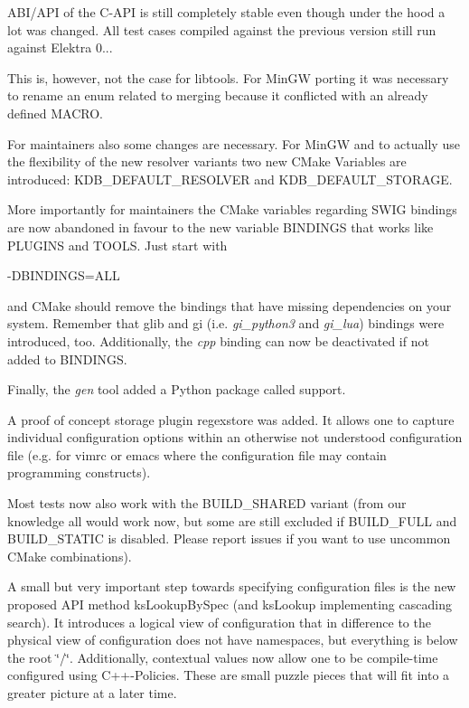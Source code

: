 A\+B\+I/\+A\+PI of the C-\/\+A\+PI is still completely stable even though under the hood a lot was changed. All test cases compiled against the previous version still run against Elektra 0...

This is, however, not the case for libtools. For Min\+GW porting it was necessary to rename an enum related to merging because it conflicted with an already defined M\+A\+C\+RO.

For maintainers also some changes are necessary. For Min\+GW and to actually use the flexibility of the new resolver variants two new C\+Make Variables are introduced\+: K\+D\+B\+\_\+\+D\+E\+F\+A\+U\+L\+T\+\_\+\+R\+E\+S\+O\+L\+V\+ER and K\+D\+B\+\_\+\+D\+E\+F\+A\+U\+L\+T\+\_\+\+S\+T\+O\+R\+A\+GE.

More importantly for maintainers the C\+Make variables regarding S\+W\+IG bindings are now abandoned in favour to the new variable B\+I\+N\+D\+I\+N\+GS that works like P\+L\+U\+G\+I\+NS and T\+O\+O\+LS. Just start with


\begin{DoxyCode}
-DBINDINGS=ALL
\end{DoxyCode}


and C\+Make should remove the bindings that have missing dependencies on your system. Remember that glib and gi (i.\+e. {\itshape gi\+\_\+python3} and {\itshape gi\+\_\+lua}) bindings were introduced, too. Additionally, the {\itshape cpp} binding can now be deactivated if not added to B\+I\+N\+D\+I\+N\+GS.

Finally, the {\itshape gen} tool added a Python package called {\ttfamily support}.

A proof of concept storage plugin {\ttfamily regexstore} was added. It allows one to capture individual configuration options within an otherwise not understood configuration file (e.\+g. for vimrc or emacs where the configuration file may contain programming constructs).

Most tests now also work with the B\+U\+I\+L\+D\+\_\+\+S\+H\+A\+R\+ED variant (from our knowledge all would work now, but some are still excluded if B\+U\+I\+L\+D\+\_\+\+F\+U\+LL and B\+U\+I\+L\+D\+\_\+\+S\+T\+A\+T\+IC is disabled. Please report issues if you want to use uncommon C\+Make combinations).

A small but very important step towards specifying configuration files is the new proposed A\+PI method ks\+Lookup\+By\+Spec (and ks\+Lookup implementing cascading search). It introduces a {\ttfamily logical view} of configuration that in difference to the {\ttfamily physical view} of configuration does not have namespaces, but everything is below the root \char`\"{}/\char`\"{}. Additionally, contextual values now allow one to be compile-\/time configured using C++-\/\+Policies. These are small puzzle pieces that will fit into a greater picture at a later time.

